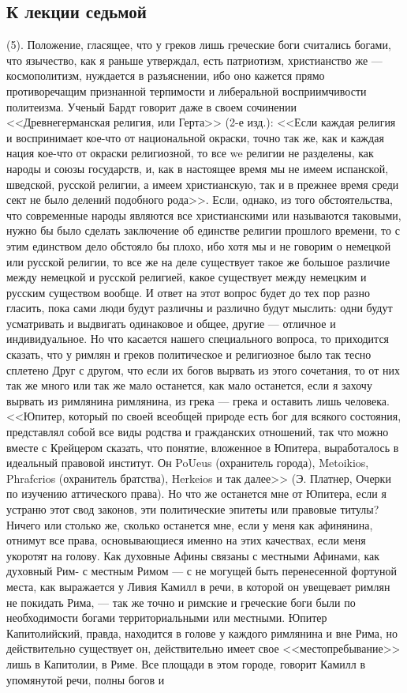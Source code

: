 \documentclass[12pt]{article}
\begin{document}
\subsection*{К лекции седьмой} 

(5). Положение, гласящее, что у греков лишь греческие боги считались богами, что язычество, как я раньше утверждал, есть патриотизм, христианство же --- космополитизм, нуждается в разъяснении, ибо оно кажется прямо противоречащим признанной терпимости и либеральной восприимчивости политеизма. Ученый Бардт говорит даже в своем сочинении <<Древнегерманская религия, или Герта>> (2-е изд.): <<Если каждая религия и воспринимает кое-что от национальной окраски, точно так же, как и каждая нация кое-что от окраски религиозной, то все we религии не разделены, как народы и союзы государств, и, как в настоящее время мы не имеем испанской, шведской, русской религии, а имеем христианскую, так и в прежнее время среди сект не было делений подобного рода>>. Если, однако, из того обстоятельства, что современные народы являются все христианскими или называются таковыми, нужно бы было сделать заключение об единстве религии прошлого времени, то с этим единством дело обстояло бы плохо, ибо хотя мы и не говорим о немецкой или русской религии, то все же на деле существует такое же большое различие между немецкой и русской религией, какое существует между немецким и русским существом вообще. И ответ на этот вопрос будет до тех пор разно гласить, пока сами люди будут различны и различно будут мыслить: одни будут усматривать и выдвигать одинаковое и общее, другие --- отличное и индивидуальное. Но что касается нашего специального вопроса, то приходится сказать, что у римлян и греков политическое и религиозное было так тесно сплетено Друг с другом, что если их богов вырвать из этого сочетания, то от них так же много или так же мало останется, как мало останется, если я захочу вырвать из римлянина римлянина, из грека --- грека и оставить лишь человека. <<Юпитер, который по своей всеобщей природе есть бог для всякого состояния, представлял собой все виды родства и гражданских отношений, так что можно вместе с Крейцером сказать, что понятие, вложенное в Юпитера, выработалось в идеальный правовой институт. Он PoUeus (охранитель города), Metoikios, Phrafcrios (охранитель братства), Herkeios и так далее>> (Э. Платнер, Очерки по изучению аттического права). Но что же останется мне от Юпитера, если я устраню этот свод законов, эти политические эпитеты или правовые титулы? Ничего или столько же, сколько останется мне, если у меня как афинянина, отнимут все права, основывающиеся именно на этих качествах, если меня укоротят на голову. Как духовные Афины связаны с местными Афинами, как духовный Рим- с местным Римом --- с не могущей быть перенесенной фортуной места, как выражается у Ливия Камилл в речи, в которой он увещевает римлян не покидать Рима, --- так же точно и римские и греческие боги были по необходимости богами территориальными или местными. Юпитер Капитолийский, правда, находится в голове у каждого римлянина и вне Рима, но действительно существует он, действительно имеет свое <<местопребывание>> лишь в Капитолии, в Риме. Все площади в этом городе, говорит Камилл в упомянутой речи, полны богов и 
\end{document}
